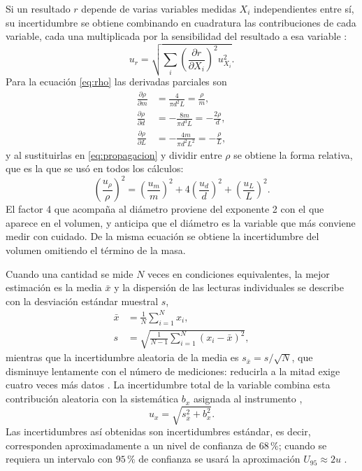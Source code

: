 Si un resultado $r$ depende de varias variables medidas $X_i$ independientes entre sí, su incertidumbre se obtiene combinando en cuadratura las contribuciones de cada variable, cada una multiplicada por la sensibilidad del resultado a esa variable \cite{taylor, coleman}:
\begin{equation}
    u_r = \sqrt{\sum_i \left( \frac{\partial r}{\partial X_i} \right)^{2} u_{X_i}^{2}}.
    \label{eq:propagacion}
\end{equation}
Para la ecuación \eqref{eq:rho} las derivadas parciales son
\begin{align}
    \frac{\partial \rho}{\partial m} &= \frac{4}{\pi d^{2} L} = \frac{\rho}{m}, \\
    \frac{\partial \rho}{\partial d} &= -\frac{8m}{\pi d^{3} L} = -\frac{2\rho}{d}, \\
    \frac{\partial \rho}{\partial L} &= -\frac{4m}{\pi d^{2} L^{2}} = -\frac{\rho}{L},
\end{align}
y al sustituirlas en \eqref{eq:propagacion} y dividir entre $\rho$ se obtiene la forma relativa, que es la que se usó en todos los cálculos:
\begin{equation}
    \left(\frac{u_\rho}{\rho}\right)^{2} = \left(\frac{u_m}{m}\right)^{2} + 4\left(\frac{u_d}{d}\right)^{2} + \left(\frac{u_L}{L}\right)^{2}.
    \label{eq:rho_rel}
\end{equation}
El factor 4 que acompaña al diámetro proviene del exponente 2 con el que aparece en el volumen, y anticipa que el diámetro es la variable que más conviene medir con cuidado. De la misma ecuación se obtiene la incertidumbre del volumen omitiendo el término de la masa.

Cuando una cantidad se mide $N$ veces en condiciones equivalentes, la mejor estimación es la media $\bar{x}$ y la dispersión de las lecturas individuales se describe con la desviación estándar muestral $s$,
\begin{align}
    \bar{x} &= \frac{1}{N}\sum_{i=1}^{N} x_i, \label{eq:media}\\
    s &= \sqrt{\frac{1}{N-1}\sum_{i=1}^{N}(x_i - \bar{x})^{2}}, \label{eq:desv}
\end{align}
mientras que la incertidumbre aleatoria de la media es $s_{\bar{x}} = s/\sqrt{N}$, que disminuye lentamente con el número de mediciones: reducirla a la mitad exige cuatro veces más datos \cite{taylor}. La incertidumbre total de la variable combina esta contribución aleatoria con la sistemática $b_x$ asignada al instrumento \cite{coleman},
\begin{equation}
    u_x = \sqrt{s_{\bar{x}}^{2} + b_x^{2}}.
    \label{eq:combinada}
\end{equation}
Las incertidumbres así obtenidas son incertidumbres estándar, es decir, corresponden aproximadamente a un nivel de confianza de $68\,\%$; cuando se requiera un intervalo con $95\,\%$ de confianza se usará la aproximación $U_{95} \approx 2u$ \cite{coleman}.

